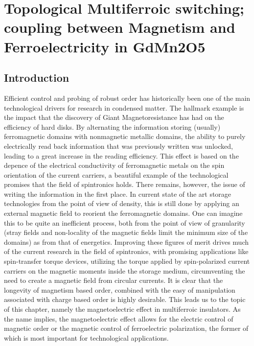 \chapter{Topological Multiferroic switching; coupling between Magnetism and Ferroelectricity in GdMn2O5}
\section{Introduction}
Efficient control and probing of robust order has historically been one of the main technological drivers for research in condensed matter.
The hallmark example is the impact that the discovery of Giant Magnetoresistance has had on the efficiency of hard disks.
By alternating the information storing (usually) ferromagnetic domains with nonmagnetic metallic domains, the ability to purely electrically read back information that was previously written was unlocked, leading to a great increase in the reading efficiency.
This effect is based on the depence of the electrical conductivity of ferromagnetic metals on the spin orientation of the current carriers, a beautiful example of the technological promises that the field of spintronics holds.
There remains, however, the issue of writing the information in the first place.
In current state of the art storage technologies from the point of view of density, this is still done by applying an external magnetic field to reorient the ferromagnetic domains. One can imagine this to be quite an inefficient process, both from the point of view of granularity (stray fields and non-locality of the magnetic fields limit the minimum size of the domains) as from that of energetics.
Improving these figures of merit drives much of the current research in the field of spintronics, with promising applications like spin-transfer torque devices, utilizing the torque applied by spin-polarized current carriers on the magnetic moments inside the storage medium, circumventing the need to create a magnetic field from circular currents.
It is clear that the longevity of magnetism based order, combined with the easy of manipulation associated with charge based order is highly desirable.
This leads us to the topic of this chapter, namely the magnetoelectric effect in multiferroic insulators.
As the name implies, the magnetoelectric effect allows for the electric control of magnetic order or the magnetic control of ferroelectric polarization\cite{Spaldin2019,Khomskii2009,Fiebig2005,Fiebig2016,Cheong2007}, the former of which is most important for technological applications.
